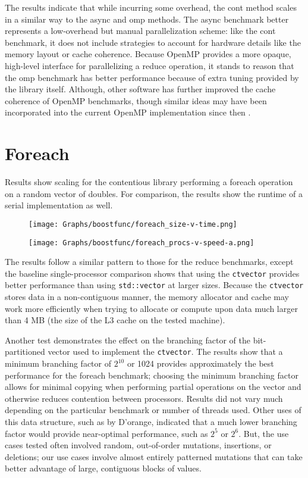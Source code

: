 The results indicate that while incurring some overhead, the cont method
scales in a similar way to the async and omp methods. The async benchmark
better represents a low-overhead but manual parallelization scheme: like the
cont benchmark, it does not include strategies to account for hardware details
like the memory layout or cache coherence. Because OpenMP provides a more
opaque, high-level interface for parallelizing a reduce operation, it stands to
reason that the omp benchmark has better performance because of extra tuning
provided by the library itself. Although, other software has further improved
the cache coherence of OpenMP benchmarks, though similar ideas may have been
incorporated into the current OpenMP implementation since then
\cite{cachecoherence}.

\section{Foreach}
Results show scaling for the contentious library performing a foreach operation
on a random vector of doubles. For comparison, the results show the runtime of a
serial implementation as well.

\begin{figure}[!h]
\centering
    \texttt{[image: Graphs/boostfunc/foreach\_size-v-time.png]}
\end{figure}
\begin{figure}[!h]
\centering
    \texttt{[image: Graphs/boostfunc/foreach\_procs-v-speed-a.png]}
\end{figure}

The results follow a similar pattern to those for the reduce benchmarks, except
the baseline single-processor comparison shows that using the \texttt{ctvector}
provides better performance than using \texttt{std::vector} at larger sizes. Because the
\texttt{ctvector} stores data in a non-contiguous manner, the memory allocator
and cache may work more efficiently when trying to allocate or compute upon data
much larger than 4 MB (the size of the L3 cache on the tested machine).

Another test demonstrates the effect on the branching factor of the
bit-partitioned vector used to implement the \texttt{ctvector}. The results show
that a minimum branching factor of $2^{10}$ or 1024 provides approximately the
best performance for the foreach benchmark; choosing the minimum branching
factor allows for minimal copying when performing partial operations on the
vector and otherwise reduces contention between processors. Results did not vary
much depending on the particular benchmark or number of threads used. Other uses
of this data structure, such as by D'orange, indicated that a much lower
branching factor would provide near-optimal performance, such as $2^5$ or $2^6$.
But, the use cases tested often involved random, out-of-order mutations,
insertions, or deletions; our use cases involve almost entirely patterned
mutations that can take better advantage of large, contiguous blocks of values.

